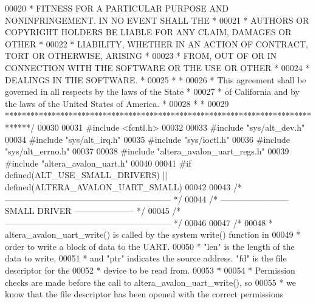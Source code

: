 \begin{DoxyCode}
00020 \textcolor{comment}{* FITNESS FOR A PARTICULAR PURPOSE AND NONINFRINGEMENT. IN NO EVENT SHALL THE *}
00021 \textcolor{comment}{* AUTHORS OR COPYRIGHT HOLDERS BE LIABLE FOR ANY CLAIM, DAMAGES OR OTHER      *}
00022 \textcolor{comment}{* LIABILITY, WHETHER IN AN ACTION OF CONTRACT, TORT OR OTHERWISE, ARISING     *}
00023 \textcolor{comment}{* FROM, OUT OF OR IN CONNECTION WITH THE SOFTWARE OR THE USE OR OTHER         *}
00024 \textcolor{comment}{* DEALINGS IN THE SOFTWARE.                                                   *}
00025 \textcolor{comment}{*                                                                             *}
00026 \textcolor{comment}{* This agreement shall be governed in all respects by the laws of the State   *}
00027 \textcolor{comment}{* of California and by the laws of the United States of America.              *}
00028 \textcolor{comment}{*                                                                             *}
00029 \textcolor{comment}{******************************************************************************/}
00030 
00031 \textcolor{preprocessor}{#include <fcntl.h>}
00032 
00033 \textcolor{preprocessor}{#include "sys/alt_dev.h"}
00034 \textcolor{preprocessor}{#include "sys/alt_irq.h"}
00035 \textcolor{preprocessor}{#include "sys/ioctl.h"}
00036 \textcolor{preprocessor}{#include "sys/alt_errno.h"}
00037 
00038 \textcolor{preprocessor}{#include "altera_avalon_uart_regs.h"}
00039 \textcolor{preprocessor}{#include "altera_avalon_uart.h"}
00040 
00041 \textcolor{preprocessor}{#if defined(ALT\_USE\_SMALL\_DRIVERS) || defined(ALTERA\_AVALON\_UART\_SMALL)}
00042 
00043 \textcolor{comment}{/* ----------------------------------------------------------- */}
00044 \textcolor{comment}{/* ------------------------ SMALL DRIVER --------------------- */}
00045 \textcolor{comment}{/* ----------------------------------------------------------- */}
00046 
00047 \textcolor{comment}{/*}
00048 \textcolor{comment}{ * altera\_avalon\_uart\_write() is called by the system write() function in }
00049 \textcolor{comment}{ * order to write a block of data to the UART. }
00050 \textcolor{comment}{ * "len" is the length of the data to write,}
00051 \textcolor{comment}{ * and "ptr" indicates the source address. "fd" is the file descriptor for the }
00052 \textcolor{comment}{ * device to be read from.}
00053 \textcolor{comment}{ *}
00054 \textcolor{comment}{ * Permission checks are made before the call to altera\_avalon\_uart\_write(), so}
00055 \textcolor{comment}{ * we know that the file descriptor has been opened with the correct permissions}

\end{DoxyCode}
